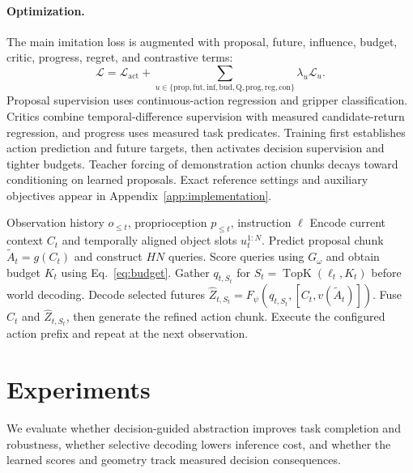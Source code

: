 \documentclass{article}
\newcommand{\method}{DIWA}
\newcommand{\TopK}{\operatorname{TopK}}
\begin{document}
\paragraph{Optimization.}
The main imitation loss is augmented with proposal, future, influence, budget, critic, progress, regret, and contrastive terms:
\begin{equation}
\mathcal L=\mathcal L_{\mathrm{act}}
+\sum_{u\in\{\mathrm{prop,fut,inf,bud,Q,prog,reg,con}\}}
\lambda_u\mathcal L_u.
\label{eq:total}
\end{equation}
Proposal supervision uses continuous-action regression and gripper classification. Critics combine temporal-difference supervision with measured candidate-return regression, and progress uses measured task predicates. Training first establishes action prediction and future targets, then activates decision supervision and tighter budgets. Teacher forcing of demonstration action chunks decays toward conditioning on learned proposals. Exact reference settings and auxiliary objectives appear in Appendix~\ref{app:implementation}.

\begin{algorithm}[t]
\caption{\method{} at one control step}
\label{alg:inference}
\begin{algorithmic}[1]
\REQUIRE Observation history $o_{\leq t}$, proprioception $p_{\leq t}$, instruction $\ell$
\STATE Encode current context $C_t$ and temporally aligned object slots $u_t^{1:N}$.
\STATE Predict proposal chunk $\widetilde A_t=g(C_t)$ and construct $HN$ queries.
\STATE Score queries using $G_\omega$ and obtain budget $K_t$ using Eq.~\eqref{eq:budget}.
\STATE Gather $q_{t,S_t}$ for $S_t=\TopK(\ell_t,K_t)$ before world decoding.
\STATE Decode selected futures $\widehat Z_{t,S_t}=F_\psi(q_{t,S_t},[C_t,v(\widetilde A_t)])$.
\STATE Fuse $C_t$ and $\widehat Z_{t,S_t}$, then generate the refined action chunk.
\STATE Execute the configured action prefix and repeat at the next observation.
\end{algorithmic}
\end{algorithm}

\section{Experiments}
\label{sec:experiments}
We evaluate whether decision-guided abstraction improves task completion and robustness, whether selective decoding lowers inference cost, and whether the learned scores and geometry track measured decision consequences.
\end{document}
